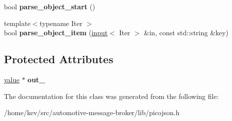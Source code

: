 \begin{DoxyCompactItemize}
\item 
\hypertarget{classpicojson_1_1default__parse__context_a54eba00b93ce4cdaf8b2acac4ef3e046}{bool {\bfseries parse\+\_\+object\+\_\+start} ()}\label{classpicojson_1_1default__parse__context_a54eba00b93ce4cdaf8b2acac4ef3e046}

\item 
\hypertarget{classpicojson_1_1default__parse__context_adf71929b098e4f4b5c32222af149655a}{{\footnotesize template$<$typename Iter $>$ }\\bool {\bfseries parse\+\_\+object\+\_\+item} (\hyperlink{classpicojson_1_1input}{input}$<$ Iter $>$ \&in, const std\+::string \&key)}\label{classpicojson_1_1default__parse__context_adf71929b098e4f4b5c32222af149655a}

\end{DoxyCompactItemize}
\subsection*{Protected Attributes}
\begin{DoxyCompactItemize}
\item 
\hypertarget{classpicojson_1_1default__parse__context_a89547d73da32e470068649e54646ff19}{\hyperlink{classpicojson_1_1value}{value} $\ast$ {\bfseries out\+\_\+}}\label{classpicojson_1_1default__parse__context_a89547d73da32e470068649e54646ff19}

\end{DoxyCompactItemize}


The documentation for this class was generated from the following file\+:\begin{DoxyCompactItemize}
\item 
/home/kev/src/automotive-\/message-\/broker/lib/picojson.\+h\end{DoxyCompactItemize}
